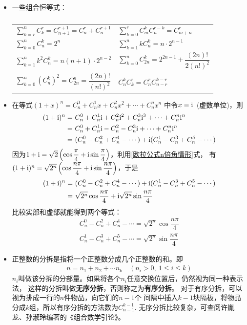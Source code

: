 \begin{itemize}[leftmargin=\inteval{\myitemleftmargin}pt,itemsep=
   \inteval{\myitemitempsep}pt,topsep=\inteval{\myitemtopsep}pt]
\item 一些组合恒等式：
\begin{table}[h] 
\caption{} 
\centering
\begin{tabular}{l|l} \label{组合恒等式}
    $\sum\limits_{k=r}^{n} C_k^r=C_{n+1}^{r+1}=C_n^r+C_n^{r+1}$  &		
    $\sum\limits_{k=0}^{r}C_m^kC_n^{r-k}=C_{m+n}^r $     \\
    $\sum\limits_{k=0}^{n} C_n^k=2^{n} $		&
    $\sum\limits_{k=1}^{n} kC_n^k=n\cdot2^{n-1} $  \\
    $\sum\limits_{k=1}^{n} k^2C_n^k=n(n+1)\cdot2^{n-2} $  &
    $\sum\limits_{k=0}^{n} C_{2n}^k=2^{2n-1}+\dfrac{(2n)!}{2(n!)^2} $  \\
    $\sum\limits_{k=0}^{n} \left( C_{n}^k\right) ^2=C_{2n}^n=\dfrac{(2n)!}{(n!)^2} $  &
    $C_n^kC_k^r=C_n^rC_{n-r}^{k-r} $
\end{tabular}
\end{table} 

\item 在等式$ (1+x)^n=C_n^0+C_n^1x+C_n^2x^2+\cdots + C_n^nx^n $
中令$ x=\mathrm{i} $\ (虚数单位)，则
\begin{align*}
    (1+\mathrm{i})^n=&\ C_n^0+C_n^1\mathrm{i}+C_n^2\mathrm{i}^2+C_n^3\mathrm{i}^3+
    \cdots + C_n^n\mathrm{i}^n  \\
    =&\ C_n^0+C_n^1\mathrm{i}-C_n^2-C_n^3\mathrm{i}+
    \cdots + C_n^n\mathrm{i}^n  \\
    =&\ (C_n^0-C_n^2+C_n^4-\cdots)+\mathrm{i} (C_n^1-C_n^3+C_n^5-\cdots)
\end{align*}
因为$ 1+\mathrm{i}=\sqrt{2}\left(\cos\dfrac{\pi}{4}+
\mathrm{i}\sin\dfrac{\pi}{4}\right) $，利用\eqref{欧拉公式n倍角情形}式，
有$ (1+\mathrm{i})^{n}=\sqrt{2^{n}}\left(\cos\dfrac{n\pi}{4}
+\mathrm{i}\sin\dfrac{n\pi}{4}\right) $，于是
\begin{align*}
    (1+\mathrm{i})^{n}
    =&\ (C_n^0-C_n^2+C_n^4-\cdots)+\mathrm{i} (C_n^1-C_n^3+C_n^5-\cdots)\\
    =&\ \sqrt{2^{n}}\cos\dfrac{n\pi}{4}
    +\mathrm{i}\sqrt{2^{n}}\sin\dfrac{n\pi}{4}
\end{align*}
比较实部和虚部就能得到两个等式：
\begin{gather*}
    C_n^0-C_n^2+C_n^4-\cdots=\sqrt{2^{n}}\cos\dfrac{n\pi}{4} \\
    C_n^1-C_n^3+C_n^5-\cdots=\sqrt{2^{n}}\sin\dfrac{n\pi}{4}
\end{gather*}

\item 正整数的分拆是指将一个正整数分成几个正整数的和。即
\begin{align*}
    n=n_1+n_2+\cdots n_k \quad (n_i>0,\ 1\leq i\leq k)
\end{align*}
$ n_i $叫做该分拆的分部量。如果将各个$ n_i $任意交换位置后，仍然视为同一种表示法，
这样的分拆叫做\textbf{无序分拆}，否则称之为\textbf{有序分拆}。
对于有序分拆，可以视为排成一行的$ n $件物品，向它们的$ n-1 $个
间隔中插入$ k-1 $块隔板，将物品分成$ k $组，所以有序分拆的方法数为$ C_{n-1}^{k-1} $. 
无序分拆比较复杂，可查阅许胤龙、孙淑玲编著的《组合数学引论》。


\end{itemize}
